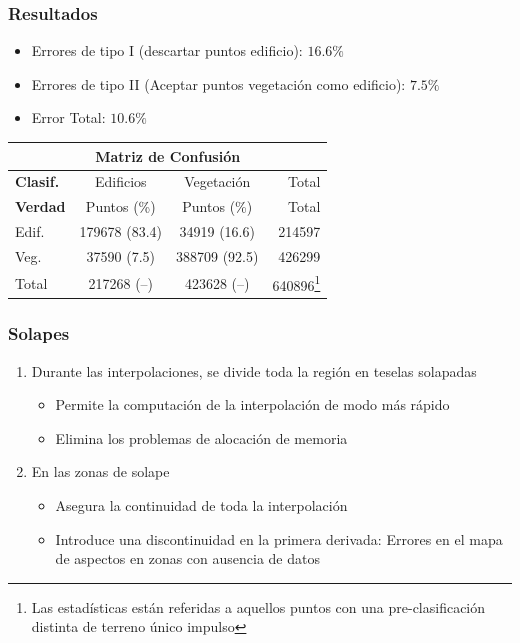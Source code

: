 \begin{frame}
  \frametitle{Resultados}
  \begin{itemize}[<+->]
    \item Errores de \alert<1>{tipo I} (descartar puntos edificio):
      \alert<1>{$16.6\%$}
    \item Errores de \alert<2>{tipo II} (Aceptar puntos vegetación como
      edificio): \alert<2>{$7.5\%$}
      \item \alert<3>{Error Total}: \alert<3>{$10.6\%$}
    \end{itemize} 
     \begin{table}[b!]
    \centering
    \begin{tabular}{lccccr}
      \multicolumn{6}{c}{\bfseries{Matriz de Confusión}} \\
      \hline
      \textbf{Clasif.} & \multicolumn{2}{c}{Edificios} & 
        \multicolumn{2}{c}{Vegetación} & Total \\
      \cline{2-6}
      \textbf{Verdad} & \multicolumn{2}{c}{Puntos (\%)} & 
        \multicolumn{2}{c}{Puntos (\%)} & Total \\
      \hline
      Edif. & \multicolumn{2}{c}{179678 (83.4)} & 
        \multicolumn{2}{c}{34919 (\alert<1>{16.6})} & 214597 \\
      Veg. & \multicolumn{2}{c}{37590 (\alert<2>{7.5})} & 
        \multicolumn{2}{c}{388709 (92.5)} & 426299 \\
      Total & \multicolumn{2}{c}{217268 (--)} & 
      \multicolumn{2}{c}{423628 (--)} & 640896\footnote{Las estadísticas están referidas a aquellos puntos con una pre-clasificación distinta de terreno único impulso} \\
      \hline
    \end{tabular}
    \end{table}
\end{frame}
\begin{frame}
  \frametitle{Solapes}
  \begin{enumerate}
    \item<1-> Durante las interpolaciones, se divide toda la región en teselas
      solapadas
      \begin{itemize}
        \item<1-> Permite la computación de la interpolación de modo más rápido
        \item<2-> Elimina los problemas de alocación de memoria
      \end{itemize}
    \item<3-> En las zonas de solape
    \begin{itemize}
        \item<3-> Asegura la continuidad de toda la interpolación
        \item<4-> Introduce una discontinuidad en la primera derivada: Errores en el
          mapa de aspectos en zonas con ausencia de datos
      \end{itemize}
  \end{enumerate}
\end{frame}
